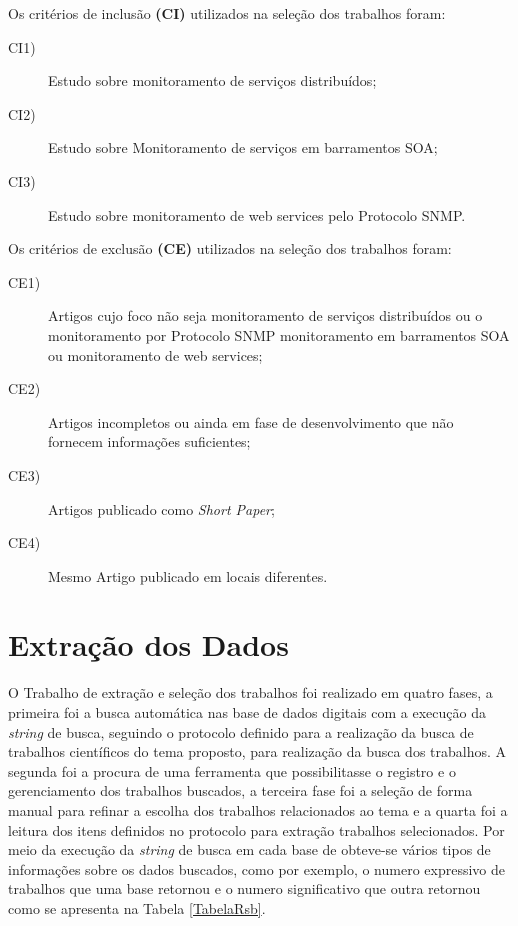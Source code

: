 Os critérios de inclusão \textbf{(CI)} utilizados na seleção dos trabalhos foram:

\begin{description}

\item[CI1)] Estudo sobre monitoramento de serviços distribuídos;
\item[CI2)] Estudo sobre Monitoramento de serviços em barramentos SOA;
\item[CI3)] Estudo sobre monitoramento de web services pelo Protocolo SNMP.
\end{description}

Os critérios de exclusão \textbf{(CE)} utilizados na seleção dos trabalhos foram:

\begin{description}
\item[CE1)]Artigos cujo foco não seja monitoramento de serviços distribuídos ou o monitoramento por Protocolo SNMP monitoramento em barramentos SOA ou monitoramento de web services;
\item[CE2)] Artigos incompletos ou ainda em fase de desenvolvimento que não fornecem informações suficientes;
\item[CE3)] Artigos publicado como \textit{Short Paper};
\item[CE4)] Mesmo Artigo publicado em locais diferentes.
\end{description}


\section{Extração dos Dados}
O Trabalho de extração e seleção dos trabalhos foi realizado em quatro fases, a primeira foi a busca automática nas base de dados digitais com a execução da \textit{string} de busca, seguindo o protocolo definido para a realização da busca de trabalhos científicos do tema proposto, para realização da busca dos trabalhos. A segunda foi a procura de uma ferramenta que possibilitasse o registro e o gerenciamento dos trabalhos buscados, a terceira fase foi a seleção de forma manual para refinar a escolha dos trabalhos relacionados ao tema e a quarta foi a leitura dos itens definidos no protocolo para extração trabalhos selecionados.
Por meio da execução da \textit{string} de busca em cada base de obteve-se vários tipos de informações sobre os dados buscados, como por exemplo, o numero expressivo de trabalhos que uma base retornou e o numero significativo que outra retornou como se apresenta na Tabela \ref{TabelaRsb}.


